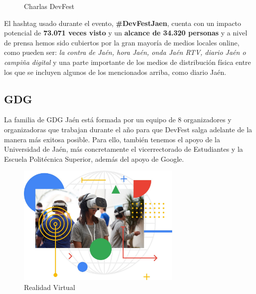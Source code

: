 \documentclass[12pt]{article}
\begin{document}
\begin{figure}
 \centering
 \caption{Charlas DevFest}
 \label{f:animales}
\end{figure}
El hashtag usado durante el evento, \textbf{\#DevFestJaen}, cuenta con un impacto potencial de \textbf{73.071 veces visto} y un \textbf{alcance de 34.320 personas} y a nivel de prensa hemos sido cubiertos por la gran mayoría de medios locales online, como pueden ser: \textit{la contra de Jaén, hora Jaén, onda Jaén RTV, diario Jaén o campiña digital} y una parte importante de los medios de distribución física entre los que se incluyen algunos de los mencionados arriba, como diario Jaén.
\subsection{GDG}

La familia de GDG Jaén está formada por un equipo de 8 organizadores y organizadoras que trabajan durante el año para que DevFest salga adelante de la manera más exitosa posible. Para ello, también tenemos el apoyo de la Universidad de Jaén, más concretamente el vicerrectorado de Estudiantes y la Escuela Politécnica Superior, además del apoyo de Google. 
\begin{figure}[h]
    \centering
    \includegraphics[width=0.7\textwidth]{assets.jpeg}
    \caption{Realidad Virtual}
    \label{fig:my_label}
\end{figure}
\end{document}

